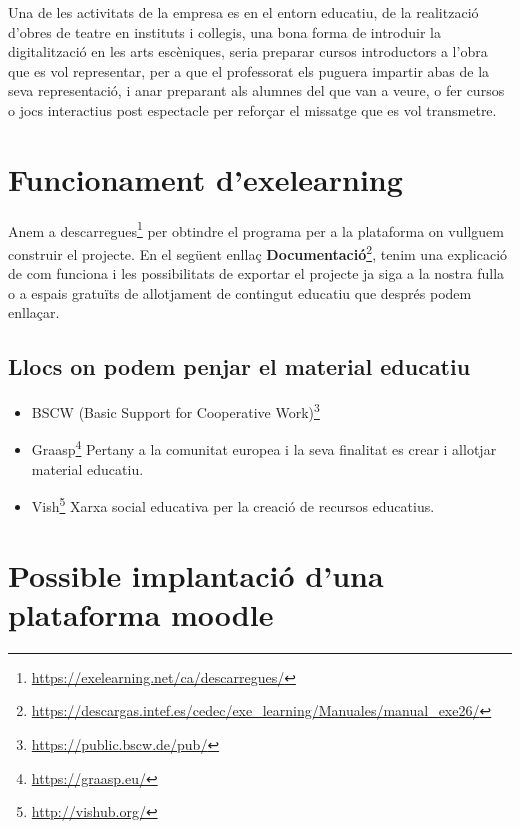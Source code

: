 \documentclass[
  10pt,
]{book}
\DeclareRobustCommand{\href}[2]{#2\footnote{\url{#1}}}
\providecommand{\tightlist}{%
  \setlength{\itemsep}{0pt}\setlength{\parskip}{0pt}}
\begin{document}
Una de les activitats de la empresa es en el entorn educatiu, de la realització d'obres de teatre en instituts i collegis, una bona forma de introduir la digitalització en les arts escèniques, seria preparar cursos introductors a l'obra que es vol representar, per a que el professorat els puguera impartir abas de la seva representació, i anar preparant als alumnes del que van a veure, o fer cursos o jocs interactius post espectacle per reforçar el missatge que es vol transmetre.

\hypertarget{funcionament-dexelearning}{%
\section{Funcionament d'exelearning}\label{funcionament-dexelearning}}

Anem a \href{https://exelearning.net/ca/descarregues/}{descarregues} per obtindre el programa per a la plataforma on vullguem construir el projecte.
En el següent enllaç \href{https://descargas.intef.es/cedec/exe_learning/Manuales/manual_exe26/}{\textbf{Documentació}}, tenim una explicació de com funciona i les possibilitats de exportar el projecte ja siga a la nostra fulla o a espais gratuïts de allotjament de contingut educatiu que després podem enllaçar.

\hypertarget{llocs-on-podem-penjar-el-material-educatiu}{%
\subsection{Llocs on podem penjar el material educatiu}\label{llocs-on-podem-penjar-el-material-educatiu}}

\begin{itemize}
\tightlist
\item
  \href{https://public.bscw.de/pub/}{BSCW (Basic Support for Cooperative Work)}
\item
  \href{https://graasp.eu/}{Graasp} Pertany a la comunitat europea i la seva finalitat es crear i allotjar material educatiu.
\item
  \href{http://vishub.org/}{Vish} Xarxa social educativa per la creació de recursos educatius.
\end{itemize}

\hypertarget{possible-implantaciuxf3-duna-plataforma-moodle}{%
\section{Possible implantació d'una plataforma moodle}\label{possible-implantaciuxf3-duna-plataforma-moodle}}
\end{document}

